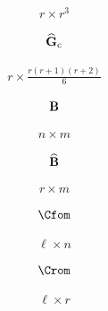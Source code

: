 \documentclass[12 pt]{article}
\begin{document}
\begin{align*}
    r \times r^3
\end{align*}

\begin{align*}
    \widehat{\mathbf{G}}_\textrm{c}
\end{align*}

\begin{align*}
    r \times \frac{r(r+1)(r+2)}{6}
\end{align*}

\begin{align*}
    \mathbf{B}
\end{align*}

\begin{align*}
    n \times m
\end{align*}

\begin{align*}
    \widehat{\mathbf{B}}
\end{align*}

\begin{align*}
    r \times m
\end{align*}

\begin{align*}
    \Cfom
\end{align*}

\begin{align*}
    \ell \times n
\end{align*}

\begin{align*}
    \Crom
\end{align*}

\begin{align*}
    \ell \times r
\end{align*}
\end{document}
